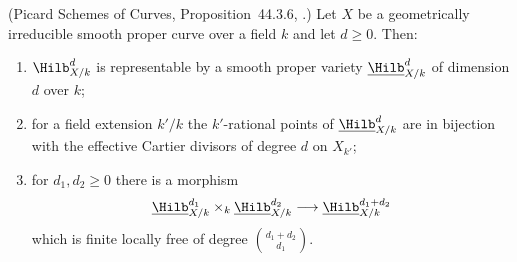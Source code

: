 \begin{theorem}
\label{thm:pc-hilb-curves}
(Picard Schemes of Curves, Proposition~44.3.6,
.)  Let $X$ be a
geometrically irreducible smooth proper curve over a field $k$ and let
$d\geq0$.  Then:
\begin{enumerate}
\item $\Hilb^d_{X/k}$ is representable by a smooth proper variety
$\underline{\Hilb}^d_{X/k}$ of dimension $d$ over $k$;
\item for a field extension $k'/k$ the $k'$-rational points of
$\underline{\Hilb}^d_{X/k}$ are in bijection with the effective Cartier
divisors of degree $d$ on $X_{k'}$;
\item for $d_1,d_2\geq0$ there is a morphism
\[
\underline{\Hilb}^{d_1}_{X/k}\times_k\underline{\Hilb}^{d_2}_{X/k}
\longrightarrow\underline{\Hilb}^{d_1+d_2}_{X/k}
\]
which is finite locally free of degree $\binom{d_1+d_2}{d_1}$.
\end{enumerate}
\end{theorem}
